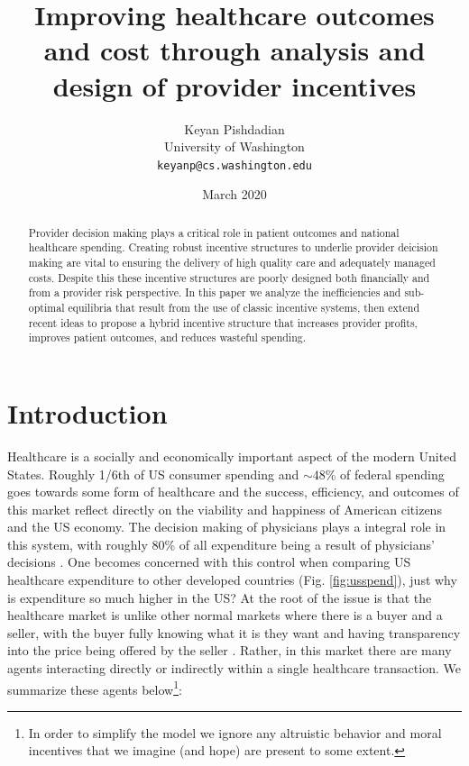 \documentclass{article}
\begin{document}
\title{Improving healthcare outcomes and cost through analysis and design of provider incentives}
\author{Keyan Pishdadian\\University of Washington\\\texttt{keyanp@cs.washington.edu}}
\date{March 2020}

\maketitle

\begin{abstract}
Provider decision making plays a critical role in patient outcomes and national healthcare spending. Creating robust incentive structures to underlie provider deicision making are vital to ensuring the delivery of high quality care and adequately managed costs. Despite this these incentive structures are poorly designed both financially and from a provider risk perspective. In this paper we analyze the inefficiencies and sub-optimal equilibria that result from the use of classic incentive systems, then extend recent ideas to propose a hybrid incentive structure that increases provider profits, improves patient outcomes, and reduces wasteful spending.
\end{abstract}


\section*{Introduction}

Healthcare is a socially and economically important aspect of the modern United States. Roughly 1/6th of US consumer spending \cite{econharvard} and ${\sim}48$\% of federal spending \cite{federalspend} goes towards some form of healthcare and the success, efficiency, and outcomes of this market reflect directly on the viability and happiness of American citizens and the US economy. The decision making of physicians plays a integral role in this system, with roughly 80\% of all expenditure being a result of physicians' decisions \cite{trust}. One becomes concerned with this control when comparing US healthcare expenditure to other developed countries (Fig. \ref{fig:usspend}), just why is expenditure so much higher in the US? At the root of the issue is that the healthcare market is unlike other normal markets where there is a buyer and a seller, with the buyer fully knowing what it is they want and having transparency into the price being offered by the seller \cite{msdt}. Rather, in this market there are many agents interacting directly or indirectly within a single healthcare transaction. We summarize these agents below\footnote{In order to simplify the model we ignore any altruistic behavior and moral incentives that we imagine (and hope) are present to some extent.}:
\end{document}
